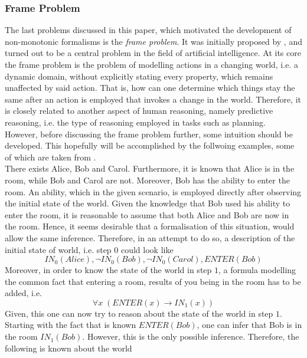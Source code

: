 \documentclass{article}
\begin{document}
\subsubsection*{Frame Problem}
The last problems discussed in this paper, which motivated the development of non-monotonic formalisms is the \emph{frame problem}. 
It was initially proposed by \cite{mccarthy1981some}, and turned out to be a central problem in the field of artificial intelligence. At its core the frame problem is the problem of modelling actions in a changing world, i.e. a dynamic domain, without explicitly stating every property, which remains unaffected by said action. That is, how can one determine which things stay the same after an action is employed that invokes a change in the world.  
Therefore, it is closely related to another aspect of human reasoning, namely predictive reasoning, i.e. the type of reasoning employed in tasks such as planning.
 \cite{BOCHMAN2007557,lifschitz2015dramatic} \\
However, before discussing the frame problem further, some intuition should be developed. This hopefully will be accomplished by the follwoing examples, some of which are taken from \cite{lifschitz2015dramatic}.  \\
\linebreak
There exists Alice, Bob and Carol. Furthermore, it is known that 
Alice is in the room, while Bob and Carol are not. Moreover, Bob has the ability to enter the room. An ability, which in the given scenario, is employed directly after observing the initial state of the world. Given the knowledge that Bob used his ability to enter the room, it is reasonable to assume that both Alice and Bob are now in the room. Hence, it seems desirable that a formalisation of this situation, would allow the same inference.
Therefore, in an attempt to do so, a description of the initial state of world, i.e. step $0$ could look like  
\begin{equation*}
IN_{0}(Alice), \neg IN_{0}(Bob), \neg IN_{0}(Carol), ENTER(Bob)
\end{equation*}
Moreover, in order to know the state of the world in step $1$, a formula modelling the common fact that entering a room, results of you being in the room has to be added, i.e. 
\begin{equation*}
\forall x \; (ENTER(x) \to IN_{1}(x))
\end{equation*}
Given, this one can now try to reason about the state of the world in step $1$. 
Starting with the fact that is known $ENTER(Bob)$, one can infer that Bob is in the room $IN_{1}(Bob)$. However, this is the only possible inference. Therefore, the following is known about the world
\end{document}
